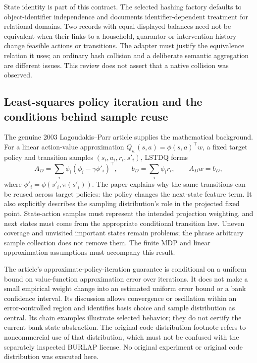 State identity is part of this contract. The selected hashing factory defaults to object-identifier independence and documents identifier-dependent treatment for relational domains. Two records with equal displayed balances need not be equivalent when their links to a household, guarantor or intervention history change feasible actions or transitions. The adapter must justify the equivalence relation it uses; an ordinary hash collision and a deliberate semantic aggregation are different issues. This review does not assert that a native collision was observed.~\citep{exec24_policyjava_burlap}

\subsection{Least-squares policy iteration and the conditions behind sample reuse}
The genuine 2003 Lagoudakis--Parr article supplies the mathematical background. For a linear action-value approximation $Q_w(s,a)=\phi(s,a)^\top w$, a fixed target policy and transition samples $(s_i,a_i,r_i,s'_i)$, LSTDQ forms
\[
 A_D=\sum_i\phi_i(\phi_i-\gamma\phi'_i)^\top,
 \qquad b_D=\sum_i\phi_i r_i,
 \qquad A_Dw=b_D,
\]
where $\phi'_i=\phi(s'_i,\pi(s'_i))$. The paper explains why the same transitions can be reused across target policies: the policy changes the next-state feature term. It also explicitly describes the sampling distribution's role in the projected fixed point. State-action samples must represent the intended projection weighting, and next states must come from the appropriate conditional transition law. Uneven coverage and unvisited important states remain problems; the phrase arbitrary sample collection does not remove them. The finite MDP and linear approximation assumptions must accompany this result.~\citep{exec24_policyjava_lspi}

The article's approximate-policy-iteration guarantee is conditional on a uniform bound on value-function approximation error over iterations. It does not make a small empirical weight change into an estimated uniform error bound or a bank confidence interval. Its discussion allows convergence or oscillation within an error-controlled region and identifies basis choice and sample distribution as central. Its chain examples illustrate selected behavior; they do not certify the current bank state abstraction. The original code-distribution footnote refers to noncommercial use of that distribution, which must not be confused with the separately inspected BURLAP license. No original experiment or original code distribution was executed here.~\citep{exec24_policyjava_lspi}

